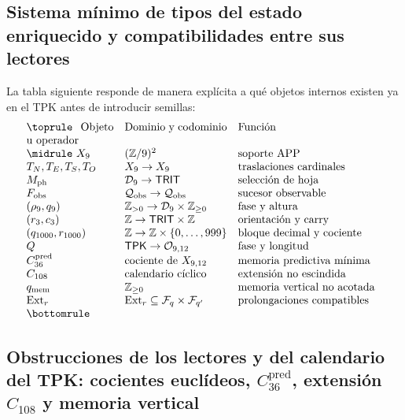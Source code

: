 \subsection{Sistema mínimo de tipos del estado enriquecido y compatibilidades entre sus lectores}

La tabla siguiente responde de manera explícita a qué objetos internos
existen ya en el TPK antes de introducir semillas:
\[
\begin{array}{p{.23\textwidth}p{.27\textwidth}p{.38\textwidth}}
\toprule
Objeto u operador&Dominio y codominio&Función\\\midrule
\(X_9\)&\((\mathbb Z/9)^2\)&soporte APP\\
\(T_N,T_E,T_S,T_O\)&\(X_9\to X_9\)&traslaciones cardinales\\
\(M_{\rm ph}\)&\(\mathcal D_9\to\mathsf{TRIT}\)&selección de hoja\\
\(F_{\rm obs}\)&\(\mathcal Q_{\rm obs}\to\mathcal Q_{\rm obs}\)&sucesor observable\\
\((\rho_9,q_9)\)&\(\mathbb Z_{>0}\to\mathcal D_9\times\mathbb Z_{\ge0}\)&fase y altura\\
\((r_3,c_3)\)&\(\mathbb Z\to\mathsf{TRIT}\times\mathbb Z\)&orientación y carry\\
\((q_{1000},r_{1000})\)&\(\mathbb Z\to\mathbb Z\times\{0,\ldots,999\}\)&bloque decimal y cociente\\
\(Q\)&\(\mathsf{TPK}\to\mathcal O_{9,12}\)&fase y longitud\\
\(C_{36}^{\rm pred}\)&cociente de \(X_{9,12}\)&memoria predictiva mínima\\
\(C_{108}\)&calendario cíclico&extensión no escindida\\
\(q_{\rm mem}\)&\(\mathbb Z_{\ge0}\)&memoria vertical no acotada\\
\(\operatorname{Ext}_r\)&
\(\operatorname{Ext}_r\subseteq\mathcal F_q\times\mathcal F_{q'}\)&
prolongaciones compatibles\\
\bottomrule
\end{array}
\]

\subsection{Obstrucciones de los lectores y del calendario del TPK: cocientes euclídeos, \(C_{36}^{\mathrm{pred}}\), extensión \(C_{108}\) y memoria vertical}

